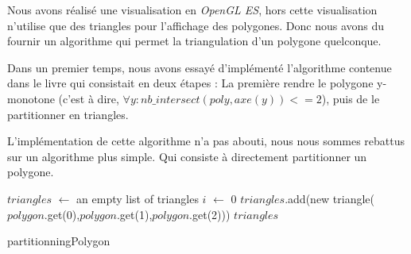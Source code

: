 Nous avons réalisé une visualisation en \emph{OpenGL ES}, hors cette visualisation n'utilise que des triangles pour l'affichage des polygones. Donc nous avons du fournir un algorithme qui permet la triangulation d'un polygone quelconque.

Dans un premier temps, nous avons essayé d'implémenté l'algorithme contenue dans le livre \cite[p.~45]{compute} qui consistait en deux étapes : La première rendre le polygone y-monotone (c'est à dire, $\forall y : nb\_intersect(poly,axe(y))<=2$), puis de le partitionner en triangles.

L'implémentation de cette algorithme n'a pas abouti, nous nous sommes rebattus sur un algorithme plus simple. Qui consiste à directement partitionner un polygone.\\

\begin{algorithm}[H]
$triangles$ $\gets$ an empty list of triangles\;
$i$ $\gets$ 0\;
$triangles$.add(new triangle($polygon$.get(0),$polygon$.get(1),$polygon$.get(2)))\;
\Return $triangles$\;
\caption{partitionningPolygon\label{triangulation}}
\end{algorithm}